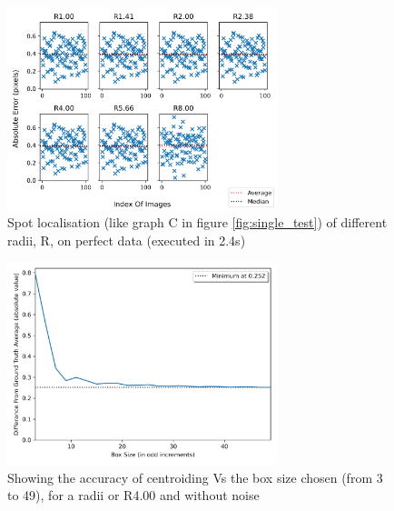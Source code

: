 \documentclass[aps,pra,a4paper,nofootinbib,onecolumn,tightenlines,longbibliography,12pt,amsfonts,amssymb,amsmath,floatfix]{revtex4-2} %
\begin{document}
  \begin{figure}[H]
    \begin{center}
      \includegraphics[width=0.7\textwidth]{project_pics/no_noise_all_r.png}
    \end{center}
    \caption{Spot localisation (like graph C in figure \ref{fig:single_test}) of different radii, R, on perfect data (executed in 2.4s)}
    \label{fig:no_noise_all_r}
  \end{figure}

 \begin{figure}[H]
   \begin{center}
     \includegraphics[width=0.7\textwidth]{project_pics/box_size_var_r4.png}
   \end{center}
   \caption{Showing the accuracy of centroiding Vs the box size chosen (from 3 to 49), for a radii or R4.00 and without noise}
   \label{fig:box_size_var_r4}
 \end{figure}
\end{document}
